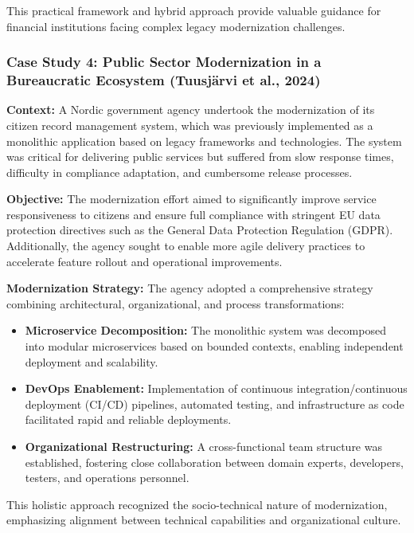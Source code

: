 \documentclass[12pt]{article}
\begin{document}
This practical framework and hybrid approach provide valuable guidance for financial institutions facing complex legacy modernization challenges.

\vspace{0.5cm}

\subsubsection{Case Study 4: Public Sector Modernization in a Bureaucratic Ecosystem (Tuusjärvi et al., 2024)}

\textbf{Context:}  
A Nordic government agency undertook the modernization of its citizen record management system, which was previously implemented as a monolithic application based on legacy frameworks and technologies. The system was critical for delivering public services but suffered from slow response times, difficulty in compliance adaptation, and cumbersome release processes.

\textbf{Objective:}  
The modernization effort aimed to significantly improve service responsiveness to citizens and ensure full compliance with stringent EU data protection directives such as the General Data Protection Regulation (GDPR). Additionally, the agency sought to enable more agile delivery practices to accelerate feature rollout and operational improvements.

\textbf{Modernization Strategy:}  
The agency adopted a comprehensive strategy combining architectural, organizational, and process transformations:

\begin{itemize}
    \item \textbf{Microservice Decomposition:} The monolithic system was decomposed into modular microservices based on bounded contexts, enabling independent deployment and scalability.
    \item \textbf{DevOps Enablement:} Implementation of continuous integration/continuous deployment (CI/CD) pipelines, automated testing, and infrastructure as code facilitated rapid and reliable deployments.
    \item \textbf{Organizational Restructuring:} A cross-functional team structure was established, fostering close collaboration between domain experts, developers, testers, and operations personnel.
\end{itemize}

This holistic approach recognized the socio-technical nature of modernization, emphasizing alignment between technical capabilities and organizational culture.
\end{document}
